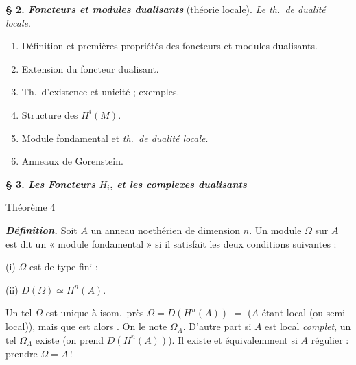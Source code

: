 \documentclass[11pt,a4paper]{article}
\begin{document}
\textbf{§ 2. \emph{Foncteurs et modules dualisants}} (théorie locale).
\emph{Le th.\ de dualité locale}.

\begin{enumerate}
  \item Définition et premières propriétés des foncteurs et modules
  dualisants.
  \item Extension du foncteur dualisant.
  \item Th.\ d'existence et unicité ; exemples.
  \item {} Structure des $H^i(M)$.
  \item Module fondamental et \emph{th.\ de dualité locale}.
  \item Anneaux de Gorenstein.
\end{enumerate}

\textbf{§ 3. \emph{Les Foncteurs} $H_i$, \emph{et les complexes
dualisants}}

 \quad Théorème 4


\textbf{\emph{Définition.}} Soit $A$ un anneau  noethérien
 de dimension $n$. Un module $\Omega$ sur $A$ est dit un
« module fondamental » si il satisfait les deux conditions \struck{\ill{}
\ill{} \ill{}} suivantes :

(i) $\Omega$ est de type fini ;

(ii) \struck{\ill{}} $D(\Omega) \simeq H^n(A)$.

Un tel $\Omega$ est unique à isom.\ près 
 $\Omega = D(H^n(A))$ \struck{\ill{}} $=$ ($A$ étant local (ou
semi-local)), mais que \ill{} est alors . On le note $\Omega_A$. D'autre part si $A$
est local \emph{complet}, un tel $\Omega_A$ existe
(on prend $D(H^n(A))$). Il existe  et
équivalemment si $A$ régulier : prendre $\Omega = A$\,!
\end{document}
